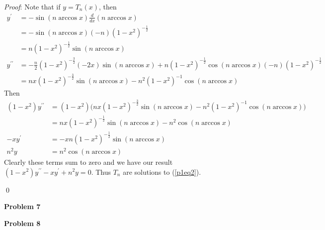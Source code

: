 \documentclass[12pt]{article}
\newcommand{\problem}[1]{\hspace{-4 ex} \large \textbf{Problem #1} }
\renewenvironment{proof}{\hspace{-4 ex} \emph{Proof}:}{\qed}
\begin{document}
	\begin{proof}
		Note that if $y = T_n(x)$, then
		\begin{align*}
		y^\prime & = -\sin{(n \arccos{x})} \tfrac{d}{dx}(n \arccos{x}) \\
		& = -\sin{(n \arccos{x})} (-n)(1-x^2)^{-\frac{1}{2}} \\
		& = n(1-x^2)^{-\frac{1}{2}}\sin{(n \arccos{x})}  \\
		y^{\prime\prime} &= -\tfrac{n}{2}(1-x^2)^{-\frac{3}{2}}(-2x)\sin{(n \arccos{x})} + n(1-x^2)^{-\frac{1}{2}}\cos{(n \arccos{x})}(-n)(1-x^2)^{-\frac{1}{2}} \\
		&= nx(1-x^2)^{-\frac{3}{2}}\sin{(n \arccos{x})} - n^2(1-x^2)^{-1}\cos{(n\arccos{x})}
		\end{align*}
		Then 
		\begin{align*}
		(1-x^2)y^{\prime\prime} & = (1-x^2) \Big( nx(1-x^2)^{-\frac{3}{2}}\sin{(n \arccos{x})} - n^2(1-x^2)^{-1}\cos{(n\arccos{x})} \Big) \\
		& = nx(1-x^2)^{-\frac{1}{2}}\sin{(n \arccos{x})} - n^2\cos{(n\arccos{x})} \\
		-xy^\prime & = -x n(1-x^2)^{-\frac{1}{2}}\sin{(n \arccos{x})} \\
		n^2y & = n^2\cos{(n \arccos{x})}
		\end{align*}
		Clearly these terms sum to zero and we have our result $(1-x^2)y^{\prime\prime}-xy^\prime+n^2y=0$. Thus $T_n$ are solutions to (\ref{p1eq2}).
		
	\end{proof}

\singlespacing
\problem{7}

\singlespacing
\problem{8}
	
\end{document}
